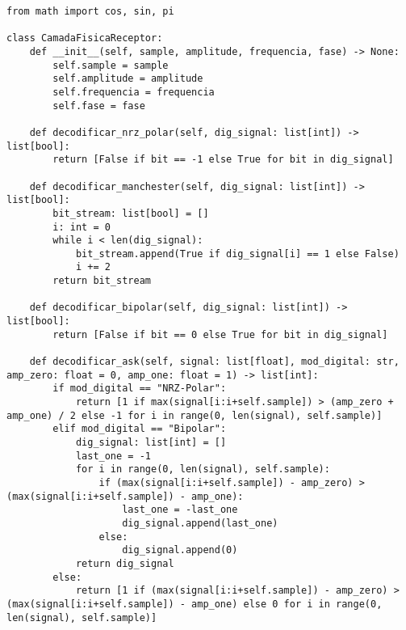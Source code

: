 \documentclass[12pt, a4paper]{article}
\newenvironment{code}{\captionsetup{type=listing}}{}
\begin{document}
\begin{code}
\begin{verbatim}
from math import cos, sin, pi

class CamadaFisicaReceptor:
    def __init__(self, sample, amplitude, frequencia, fase) -> None:
        self.sample = sample
        self.amplitude = amplitude
        self.frequencia = frequencia
        self.fase = fase
    
    def decodificar_nrz_polar(self, dig_signal: list[int]) -> list[bool]:
        return [False if bit == -1 else True for bit in dig_signal]
    
    def decodificar_manchester(self, dig_signal: list[int]) -> list[bool]:
        bit_stream: list[bool] = []
        i: int = 0
        while i < len(dig_signal):
            bit_stream.append(True if dig_signal[i] == 1 else False)
            i += 2
        return bit_stream
    
    def decodificar_bipolar(self, dig_signal: list[int]) -> list[bool]:
        return [False if bit == 0 else True for bit in dig_signal]
    
    def decodificar_ask(self, signal: list[float], mod_digital: str, amp_zero: float = 0, amp_one: float = 1) -> list[int]:
        if mod_digital == "NRZ-Polar":
            return [1 if max(signal[i:i+self.sample]) > (amp_zero + amp_one) / 2 else -1 for i in range(0, len(signal), self.sample)]
        elif mod_digital == "Bipolar":
            dig_signal: list[int] = []
            last_one = -1
            for i in range(0, len(signal), self.sample):
                if (max(signal[i:i+self.sample]) - amp_zero) > (max(signal[i:i+self.sample]) - amp_one):
                    last_one = -last_one
                    dig_signal.append(last_one)
                else:
                    dig_signal.append(0)
            return dig_signal
        else:
            return [1 if (max(signal[i:i+self.sample]) - amp_zero) > (max(signal[i:i+self.sample]) - amp_one) else 0 for i in range(0, len(signal), self.sample)]
    

\end{verbatim}
\end{code}
\end{document}
